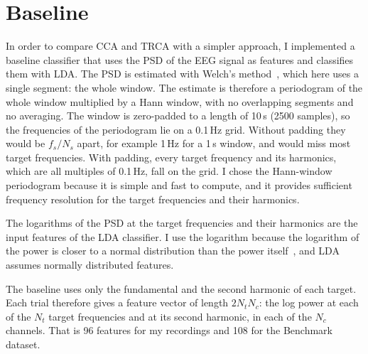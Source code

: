 \section{Baseline}
\label{sec:baseline}

In order to compare \ac{CCA} and \ac{TRCA} with a simpler approach, I implemented a baseline classifier
that uses the \ac{PSD} of the \ac{EEG} signal as features and classifies them with \ac{LDA}.
The \ac{PSD} is estimated with Welch's method~\citep{welch1967psd}, which here uses a single segment: the whole
window. The estimate is therefore a periodogram of the whole window multiplied by a Hann
window, with no overlapping segments and no averaging. The window is zero-padded to a length
of 10\,s (2500 samples), so the frequencies of the periodogram lie on a 0.1\,Hz grid. Without
padding they would be $f_s / N_s$ apart, for example 1\,Hz for a 1\,s window, and would miss
most target frequencies. With padding, every target frequency and its harmonics, which are all
multiples of 0.1\,Hz, fall on the grid.
I chose the Hann-window periodogram because it is simple and fast to compute,
and it provides sufficient frequency resolution for the target frequencies and their harmonics.

The logarithms of the \ac{PSD} at the target frequencies and their harmonics are the input
features of the \ac{LDA} classifier. I use the logarithm because the logarithm of the power is
closer to a normal distribution than the power itself~\citep{gasser1982normal}, and \ac{LDA}
assumes normally distributed features.

The baseline uses only the fundamental and the second harmonic of each target. Each trial
therefore gives a feature vector of length $2 N_t N_c$: the log power at each of the $N_t$
target frequencies and at its second harmonic, in each of the $N_c$ channels. That is 96
features for my recordings and 108 for the Benchmark dataset.

